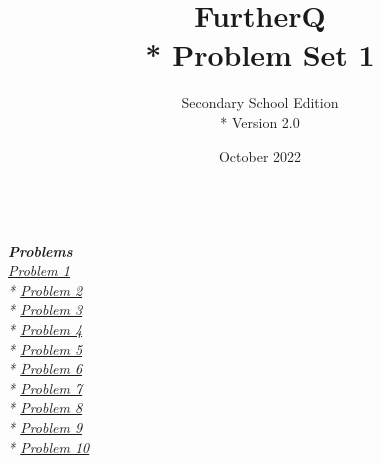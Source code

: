 
\title{FurtherQ \\* Problem Set 1}
\author{Secondary School Edition \\* Version 2.0}
\date{October 2022}




\maketitle
\textit{
  \textbf{\\\Large{Problems}}\\
  \large
  \hyperlink{P1}{Problem 1} \\*
  \hyperlink{P2}{Problem 2} \\*
  \hyperlink{P3}{Problem 3} \\*
  \hyperlink{P4}{Problem 4} \\*
  \hyperlink{P5}{Problem 5} \\*
  \hyperlink{P6}{Problem 6} \\*
  \hyperlink{P7}{Problem 7} \\*
  \hyperlink{P8}{Problem 8} \\*
  \hyperlink{P9}{Problem 9} \\*
  \hyperlink{P10}{Problem 10} \\
}

